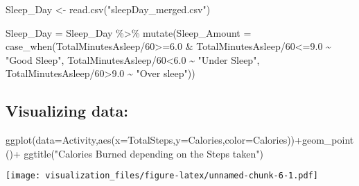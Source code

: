 \documentclass[
]{article}
\newenvironment{Shaded}{\begin{snugshade}}{\end{snugshade}}
\newcommand{\AttributeTok}[1]{\textcolor[rgb]{0.77,0.63,0.00}{#1}}
\newcommand{\DecValTok}[1]{\textcolor[rgb]{0.00,0.00,0.81}{#1}}
\newcommand{\FloatTok}[1]{\textcolor[rgb]{0.00,0.00,0.81}{#1}}
\newcommand{\FunctionTok}[1]{\textcolor[rgb]{0.00,0.00,0.00}{#1}}
\newcommand{\NormalTok}[1]{#1}
\newcommand{\OtherTok}[1]{\textcolor[rgb]{0.56,0.35,0.01}{#1}}
\newcommand{\SpecialCharTok}[1]{\textcolor[rgb]{0.00,0.00,0.00}{#1}}
\newcommand{\StringTok}[1]{\textcolor[rgb]{0.31,0.60,0.02}{#1}}
\begin{document}
\begin{Shaded}
\begin{Highlighting}[]
\NormalTok{Sleep\_Day }\OtherTok{\textless{}{-}} \FunctionTok{read.csv}\NormalTok{(}\StringTok{"sleepDay\_merged.csv"}\NormalTok{)}
\end{Highlighting}
\end{Shaded}

\begin{Shaded}
\begin{Highlighting}[]
\NormalTok{Sleep\_Day }\OtherTok{=}\NormalTok{ Sleep\_Day }\SpecialCharTok{\%\textgreater{}\%} 
\FunctionTok{mutate}\NormalTok{(}\AttributeTok{Sleep\_Amount =} \FunctionTok{case\_when}\NormalTok{(TotalMinutesAsleep}\SpecialCharTok{/}\DecValTok{60}\SpecialCharTok{\textgreater{}=}\FloatTok{6.0} \SpecialCharTok{\&}\NormalTok{ TotalMinutesAsleep}\SpecialCharTok{/}\DecValTok{60}\SpecialCharTok{\textless{}=}\FloatTok{9.0}   \SpecialCharTok{\textasciitilde{}} \StringTok{"Good Sleep"}\NormalTok{,}
\NormalTok{    TotalMinutesAsleep}\SpecialCharTok{/}\DecValTok{60}\SpecialCharTok{\textless{}}\FloatTok{6.0} \SpecialCharTok{\textasciitilde{}} \StringTok{"Under Sleep"}\NormalTok{, }
\NormalTok{    TotalMinutesAsleep}\SpecialCharTok{/}\DecValTok{60}\SpecialCharTok{\textgreater{}}\FloatTok{9.0} \SpecialCharTok{\textasciitilde{}} \StringTok{"Over sleep"}\NormalTok{))}
\end{Highlighting}
\end{Shaded}

\hypertarget{visualizing-data}{%
\subsection{Visualizing data:}\label{visualizing-data}}

\begin{Shaded}
\begin{Highlighting}[]
\FunctionTok{ggplot}\NormalTok{(}\AttributeTok{data=}\NormalTok{Activity,}\FunctionTok{aes}\NormalTok{(}\AttributeTok{x=}\NormalTok{TotalSteps,}\AttributeTok{y=}\NormalTok{Calories,}\AttributeTok{color=}\NormalTok{Calories))}\SpecialCharTok{+}\FunctionTok{geom\_point}\NormalTok{()}\SpecialCharTok{+} \FunctionTok{ggtitle}\NormalTok{(}\StringTok{"Calories Burned depending on the Steps taken"}\NormalTok{)}
\end{Highlighting}
\end{Shaded}

\texttt{[image: visualization\_files/figure-latex/unnamed-chunk-6-1.pdf]}
\end{document}

